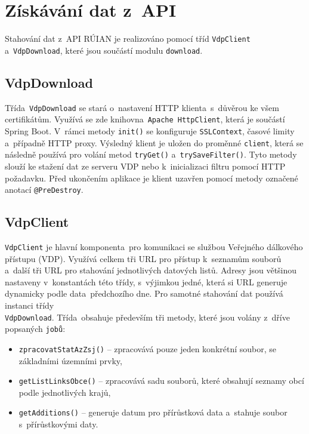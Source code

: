 \section{Získávání dat z~API}
Stahování dat z~API RÚIAN je realizováno pomocí tříd \texttt{VdpClient} a~\texttt{VdpDownload},
které jsou součástí modulu \texttt{download}.

\subsection{VdpDownload}
Třída~\texttt{VdpDownload} se stará o~nastavení HTTP klienta~s~důvěrou ke všem certifikátům.
Využívá se zde knihovna~\texttt{Apache HttpClient}, která je součástí Spring Boot.
V~rámci metody \texttt{init()} se konfiguruje \texttt{SSLContext}, časové limity a~případně HTTP proxy.
Výsledný klient je uložen do proměnné \texttt{client}, která se následně používá pro volání metod \texttt{tryGet()} a~\texttt{trySaveFilter()}.
Tyto metody slouží ke stažení dat ze serveru VDP nebo k~inicializaci filtru pomocí HTTP požadavku.
Před ukončením aplikace je klient uzavřen pomocí metody označené anotací \texttt{@PreDestroy}.

\subsection{VdpClient}
\texttt{VdpClient} je hlavní komponenta~pro komunikaci se službou Veřejného dálkového přístupu (VDP).
Využívá celkem tři URL pro přístup k~seznamům souborů a~další tři URL pro stahování jednotlivých datových listů.
Adresy jsou většinou nastaveny v~konstantách této třídy, s~výjimkou jedné, která si URL generuje dynamicky podle data~předchozího dne.
Pro samotné stahování dat používá instanci třídy \\ \texttt{VdpDownload}.
Třída~obsahuje především tři metody, které jsou volány z~dříve popsaných \texttt{jobů}:

\newpage

\begin{itemize}
    \item \texttt{zpracovatStatAzZsj()} -- zpracovává pouze jeden konkrétní soubor, se základními územními prvky,
    \item \texttt{getListLinksObce()} -- zpracovává sadu souborů, které obsahují seznamy obcí podle jednotlivých krajů,
    \item \texttt{getAdditions()} -- generuje datum pro přírůstková data a~stahuje soubor s~přírůstkovými daty.
\end{itemize}

